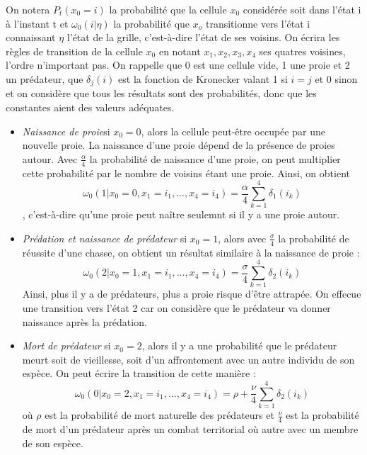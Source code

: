 On notera $ P_{t}(x_0=i)$ la probabilité que la cellule $x_0$ considérée soit dans l'état i à l'instant t et $\omega_0(i|\eta)$ la probabilité que $x_o$ transitionne vers l'état i connaissant $\eta$ l'état de la grille, c'est-à-dire l'état de ses voisins. On écrira les règles de transition de la cellule $x_0$ en notant $x_1, x_2, x_3, x_4$ ses quatres voisines, l'ordre n'important pas. On rappelle que 0 est une cellule vide, 1 une proie et 2 un prédateur, que $\delta_{j}(i)$ est la fonction de Kronecker valant 1 si $i=j$ et 0 sinon et on considère que tous les résultats sont des probabilités, donc que les constantes aient des valeurs adéquates.

\vspace{0.3cm}
\begin {itemize}
\item \textit{Naissance de proie}si $x_0=0$, alors la cellule peut-être occupée par une nouvelle proie. La naissance d'une proie dépend de la présence de proies autour. Avec $\frac{\alpha}{4}$ la probabilité de naissance d'une proie, on peut multiplier cette probabilité par le nombre de voisins étant une proie. Ainsi, on obtient \begin{equation}\omega_0(1|x_0=0, x_1=i_1, ..., x_4=i_4)=\frac{\alpha}{4}\sum_{k=1}^{4}\delta_{1}(i_k)\end{equation}, c'est-à-dire qu'une proie peut naître seulemnt si il y a une proie autour.

\vspace{0.3cm}
\item \textit{Prédation et naissance de prédateur} si $x_0=1$, alors avec $\frac{\sigma}{4}$ la probabilité de réussite d'une chasse, on obtient un résultat similaire à la naissance de proie :\begin{equation} \omega_0(2|x_0=1, x_1=i_1, ..., x_4=i_4)=\frac{\sigma}{4}\sum_{k=1}^{4}\delta_{2}(i_k)\end{equation} Ainsi, plus il y a de prédateurs, plus a proie risque d'être attrapée. On effecue une transition vers l'état 2 car on considère que le prédateur va donner naissance après la prédation.

\vspace{0.3cm}
\item \textit{Mort de prédateur}  si $x_0=2$, alors il y a une probabilité que le prédateur meurt soit de vieillesse, soit d'un affrontement avec un autre individu de son espèce. On peut écrire la transition de cette manière : \begin{equation}\omega_0(0|x_0=2, x_1=i_1, ..., x_4=i_4)=\rho + \frac{\nu}{4}\sum_{k=1}^{4}\delta_{2}(i_k)\end{equation} où $\rho$ est la probabilité de mort naturelle des prédateurs et $\frac{\nu}{4}$ est la probabilité de mort d'un prédateur après un combat territorial où autre avec un membre de son espèce. 


\end{itemize}
